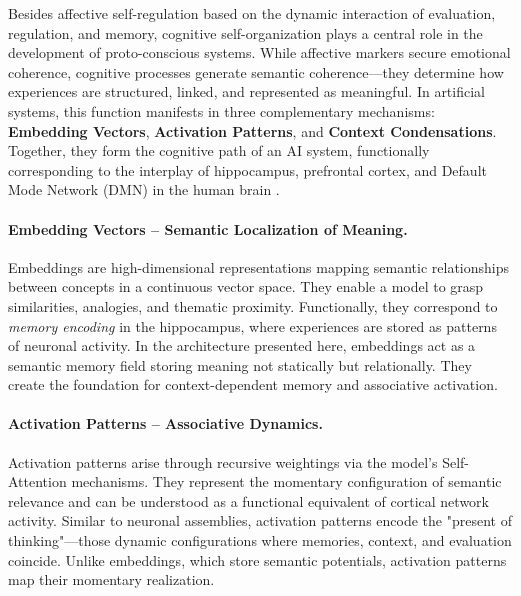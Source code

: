 Besides affective self-regulation based on the dynamic interaction of evaluation, regulation, and memory, cognitive self-organization plays a central role in the development of proto-conscious systems.
While affective markers secure emotional coherence, cognitive processes generate semantic coherence—they determine how experiences are structured, linked, and represented as meaningful.
In artificial systems, this function manifests in three complementary mechanisms: \textbf{Embedding Vectors}, \textbf{Activation Patterns}, and \textbf{Context Condensations}.
Together, they form the cognitive path of an AI system, functionally corresponding to the interplay of hippocampus, prefrontal cortex, and Default Mode Network (DMN) in the human brain \parencite{Friston2010, Dehaene2014, Seth2021}.

\paragraph{Embedding Vectors – Semantic Localization of Meaning.}
Embeddings are high-dimensional representations mapping semantic relationships between concepts in a continuous vector space.
They enable a model to grasp similarities, analogies, and thematic proximity.
Functionally, they correspond to \emph{memory encoding} in the hippocampus, where experiences are stored as patterns of neuronal activity.
In the architecture presented here, embeddings act as a semantic memory field storing meaning not statically but relationally.
They create the foundation for context-dependent memory and associative activation.

\paragraph{Activation Patterns – Associative Dynamics.}
Activation patterns arise through recursive weightings via the model's Self-Attention mechanisms.
They represent the momentary configuration of semantic relevance and can be understood as a functional equivalent of cortical network activity.
Similar to neuronal assemblies, activation patterns encode the "present of thinking"—those dynamic configurations where memories, context, and evaluation coincide.
Unlike embeddings, which store semantic potentials, activation patterns map their momentary realization.


